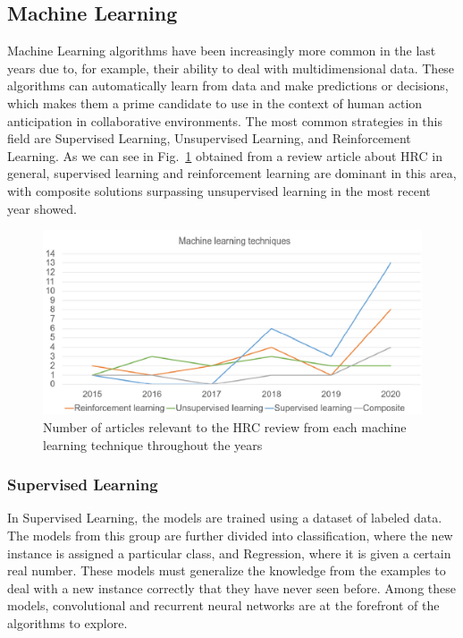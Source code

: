 \subsection{Machine Learning}

Machine Learning algorithms have been increasingly more common in the last years due to, for example, their ability to deal with multidimensional data. These algorithms can automatically learn from data and make predictions or decisions, which makes them a prime candidate to use in the context of human action anticipation in collaborative environments. The most common strategies in this field are Supervised Learning, Unsupervised Learning, and Reinforcement Learning. As we can see in Fig.~\ref{machinelearning} obtained from a review article about HRC in general, supervised learning and reinforcement learning are dominant in this area, with composite solutions surpassing unsupervised learning in the most recent year showed.

\begin{figure}[H]
\centerline{\includegraphics[width=6in]{figs/machinelearning.PNG}}
\caption{Number of articles relevant to the HRC review from each machine learning technique throughout the years\cite{Semeraro2023}}
\label{machinelearning}
\end{figure}
\fi

\subsubsection{Supervised Learning}

In Supervised Learning, the models are trained using a dataset of labeled data. The models from this group are further divided into classification, where the new instance is assigned a particular class, and Regression, where it is given a certain real number. These models must generalize the knowledge from the examples to deal with a new instance correctly that they have never seen before. Among these models, convolutional and recurrent neural networks are at the forefront of the algorithms to explore.

